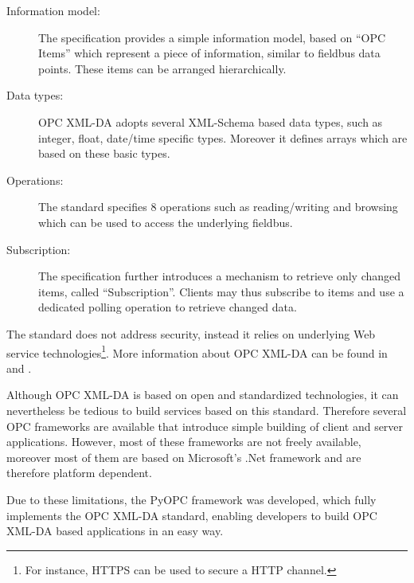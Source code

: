 \begin{description}
\item[Information model:] The specification provides a simple
information model, based on ``OPC Items'' which represent a piece of
information, similar to fieldbus data points. These items can be
arranged hierarchically.
\item[Data types:] OPC XML-DA adopts several XML-Schema based data
types, such as integer, float, date/time specific types. Moreover it
defines arrays which are based on these basic types.
\item[Operations:] The standard specifies 8 operations such as
reading/writing and browsing which can be used to access the
underlying fieldbus.
\item[Subscription:] The specification further introduces a mechanism
to retrieve only changed items, called ``Subscription''.  Clients may
thus subscribe to items and use a dedicated polling operation to
retrieve changed data.
\end{description}

The standard does not address security, instead it relies on
underlying Web service technologies\footnote{For instance, HTTPS can
be used to secure a HTTP channel.}. More information about OPC XML-DA
can be found in \cite{diplomarbeit} and \cite{OPCXMLDA}.

Although OPC XML-DA is based on open and standardized technologies, it
can nevertheless be tedious to build services based on this standard.
Therefore several OPC frameworks are available that introduce simple
building of client and server applications. However, most of these
frameworks are not freely available, moreover most of them are based
on Microsoft's .Net framework and are therefore platform dependent.

Due to these limitations, the PyOPC framework was developed, which
fully implements the OPC XML-DA standard, enabling developers to build
OPC XML-DA based applications in an easy way.
